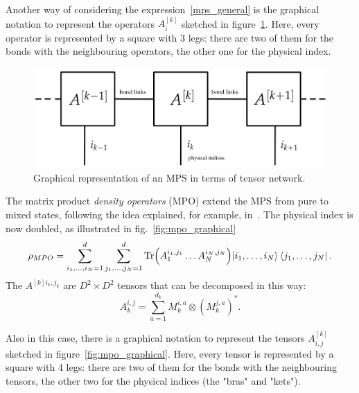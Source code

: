 Another way of considering the expression~\ref{mps_general} is the graphical notation to represent the operators $A^{[k]}_i$ sketched in figure~\ref{fig:mps_graphical}. Here, every operator is represented by a square with 3 legs: there are two of them for the bonds with the neighbouring operators, the other one for the physical index. 

\begin{figure}[H]
    \centering
    \includegraphics[scale=0.4]{Figures/mps_graphical.png}
    \captionsetup{width=1.\linewidth}
    \caption{Graphical representation of an MPS in terms of tensor network.}
    \label{fig:mps_graphical}
\end{figure}

The matrix product \emph{density operators} (MPO) extend the MPS from pure to mixed states, following the idea explained, for example, in~\cite{PhysRevLett.93.207204}. The physical index is now doubled, as illustrated in fig.~\ref{fig:mpo_graphical}
\begin{equation}
\label{eqn:mpdo}
    \rho_{MPO} = \sum_{i_1, \dots ,i_N = 1}^{d} \sum_{j_1, \dots ,j_N = 1}^{d} \operatorname{Tr}\Bigl(A_1^{i_1,j_1} \dots A_N^{i_N,j_N}\Bigl) \ket{i_1, \dots ,i_N}\bra{j_1, \dots ,j_N}.
\end{equation}
The $A^{[k]i_k,j_k}$ are $D^2 \times D^2$ tensors that can be decomposed in this way:
\begin{equation*}
    A_k^{i,j} = \sum_{a = 1}^{d_k} M_k^{i,a} \otimes (M_k^{j,a})^*.
\end{equation*}

Also in this case, there is a graphical notation to represent the tensors $A^{[k]}_{i,j}$ sketched in figure~\ref{fig:mpo_graphical}. Here, every tensor is represented by a square with 4 legs: there are two of them for the bonds with the neighbouring tensors, the other two for the physical indices (the "bras" and "kets"). 

